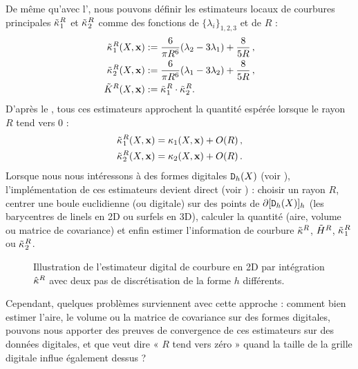 %
De même qu'avec l', nous pouvons définir
les estimateurs locaux de courbures principales $\tilde{\kappa_{}}_{1}^{R}$ et
$\tilde{\kappa_{}}_{2}^{R}$ comme des fonctions de $\{\lambda_i\}_{1,2,3}$ et de $R$ :
%
\begin{align}
  \label{eq:pottmann-3d-princ}
  \tilde{\kappa_{}}_{1}^{R}(X,\mathbf{x})& := \frac{6}{\pi R^6}(\lambda_2 - 3\lambda_1) + \frac{8}{5R}\,,\\
  \tilde{\kappa_{}}_{2}^{R}(X,\mathbf{x})& := \frac{6}{\pi R^6}(\lambda_1 - 3\lambda_2) + \frac{8}{5R}\,,\\
  \tilde{K}^{R}(X,\mathbf{x})& := \tilde{\kappa_{}}_{1}^{R} \cdot \tilde{\kappa_{}}_{2}^{R}.
\end{align}
%
D'après le , tous ces estimateurs approchent la
quantité espérée lorsque le rayon $R$ tend vers $0$ :
%
\begin{align}
  \label{eq:pottmann-3d-princ}
  \PrincCurvT{1}{R}(\Shape,\vx)& = \PrincCurv{1}(\Shape,\vx) + O(R)\,,\\
  \PrincCurvT{2}{R}(\Shape,\vx)& = \PrincCurv{2}(\Shape,\vx) + O(R)\,.%
\end{align}
%
Lorsque nous nous intéressons à des formes digitales $\mathtt{D}_{h}(X)$ (voir
), l'implémentation de ces estimateurs
devient direct (voir ) : choisir un rayon $R$,
centrer une boule euclidienne (ou digitale) sur des points de
$\partial \lbrack \mathtt{D}_{h}(X) \rbrack_{h}$ (\cad les barycentres de linels en 2D ou
surfels en 3D), calculer la quantité (aire, volume ou matrice de covariance) et
enfin estimer l'information de courbure $\tilde{\kappa}^{R}$, $\tilde{H}^{R}$,
$\tilde{\kappa_{}}_{1}^{R}$ ou $\tilde{\kappa_{}}_{2}^{R}$.
%
\begin{figure}[ht]
  \begin{center}
    
  \end{center}
  \caption[Illustration de l'estimateur digital de courbure en 2D par intégration
  $\CurvH{R}$.]{Illustration de l'estimateur digital de courbure en 2D par
  intégration $\CurvH{R}$ avec deux pas de discrétisation de la forme $h$
  différents.\label{fig:2d-curv-estimator}}
\end{figure}

Cependant, quelques problèmes surviennent avec cette approche : comment bien
estimer l'aire, le volume ou la matrice de covariance sur des formes digitales,
pouvons nous apporter des preuves de convergence de ces estimateurs sur des
données digitales, et que veut dire « $R$ tend vers zéro » quand la taille de la
grille digitale influe également dessus ?

